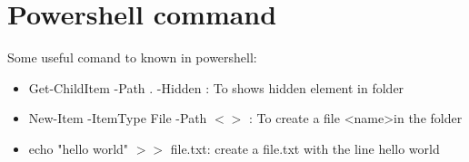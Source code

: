 \documentclass{report}
\begin{document}
\section{Powershell command} 
Some useful comand to known in powershell: 
\begin{itemize}
    \item Get-ChildItem -Path . -Hidden : To shows hidden element in folder
    \item New-Item -ItemType File -Path $<>$ : To create a file \textless name\textgreater in the folder
    \item echo "hello world" $>>$ file.txt: create a file.txt with the line hello world   
\end{itemize}
\end{document}
